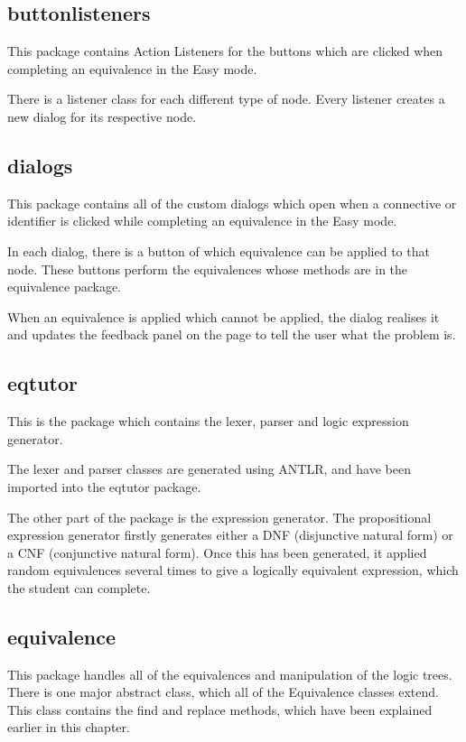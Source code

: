 \documentclass{report}
\begin{document}
\subsection{buttonlisteners}
This package contains Action Listeners for the buttons which are clicked 
when completing an equivalence in the Easy mode. 

There is a listener class for each different type of node. Every listener
creates a new dialog for its respective node.

\subsection{dialogs}
This package contains all of the custom dialogs which open when a connective
or identifier is clicked while completing an equivalence in the Easy mode.

In each dialog, there is a button of which equivalence can be applied to that
node. These buttons perform the equivalences whose methods are in the 
equivalence package.

When an equivalence is applied which cannot be applied, the dialog realises
it and updates the feedback panel on the page to tell the user what the problem
is. 


\subsection{eqtutor}
This is the package which contains the lexer, parser and logic expression
generator.

The lexer and parser classes are generated using ANTLR, and have been imported
into the eqtutor package. 

The other part of the package is the expression generator. The propositional
expression generator firstly generates either a DNF (disjunctive natural form)
or a CNF (conjunctive natural form). Once this has been generated, it applied random
equivalences several times to give a logically equivalent expression, which
the student can complete.

\subsection{equivalence}
This package handles all of the equivalences and manipulation of the logic trees.
There is one major abstract class, which all of the Equivalence classes
extend. This class contains the find and replace methods, which have been explained
earlier in this chapter.
\end{document}
